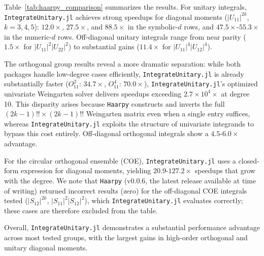 \documentclass[manuscript,screen]{acmart}
\begin{document}
Table~\ref{tab:haarpy_comparison} summarizes the results. For unitary integrals,
\texttt{IntegrateUnitary.jl} achieves strong speedups for diagonal moments ($|U_{11}|^{2k}$,
$k = 3, 4, 5$): $12.0\times$, $27.5\times$, and $88.5\times$ in the symbolic-$d$
rows, and $47.5\times$-$55.3\times$ in the numeric-$d$ rows. Off-diagonal
unitary integrals range from near parity ($1.5\times$ for
$|U_{11}|^2|U_{22}|^2$) to substantial gains ($11.4\times$ for
$|U_{11}|^4|U_{12}|^4$).

The orthogonal group results reveal a more dramatic separation: while
both packages handle low-degree cases efficiently, \texttt{IntegrateUnitary.jl} is already
substantially faster ($O_{11}^2$: $34.7\times$, $O_{11}^4$: $70.0\times$),
\texttt{IntegrateUnitary.jl}'s optimized univariate Weingarten solver delivers speedups
exceeding $2.7\times 10^4\times$ at degree 10. This disparity arises because
\texttt{Haarpy} constructs and inverts the full $(2k{-}1)!! \times (2k{-}1)!!$
Weingarten matrix even when a single entry suffices, whereas \texttt{IntegrateUnitary.jl}
exploits the structure of univariate integrands to bypass this cost entirely.
Off-diagonal orthogonal integrals show a $4.5$-$6.0\times$ advantage.

For the circular orthogonal ensemble (COE), \texttt{IntegrateUnitary.jl} uses a
closed-form expression for diagonal moments, yielding $20.9$-$127.2\times$
speedups that grow with the degree. We note that \texttt{Haarpy} (v0.0.6, the latest release available at
time of writing) returned incorrect results (zero) for the off-diagonal COE
integrals tested ($|S_{12}|^{2k}$, $|S_{11}|^2|S_{12}|^2$), which
\texttt{IntegrateUnitary.jl} evaluates correctly; these cases are therefore excluded
from the table.

Overall, \texttt{IntegrateUnitary.jl} demonstrates a substantial performance
advantage across most tested groups, with the largest gains in high-order
orthogonal and unitary diagonal moments.
\end{document}

